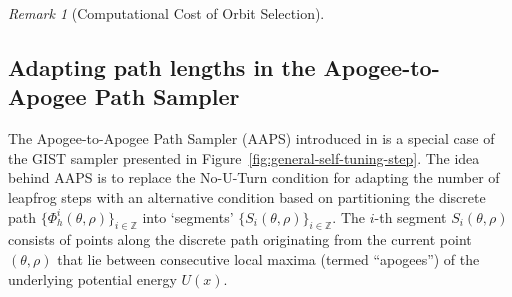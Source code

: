 \documentclass[letterpaper,11pt]{article}
\theoremstyle{plain}%
\theoremstyle{remark}
\newtheorem{remark}{Remark}
\begin{document}
\begin{remark}[Computational Cost of Orbit Selection]

\end{remark}

\subsection{Adapting path lengths in the Apogee-to-Apogee Path Sampler}\label{sec:Apogee-to-Apogee}

The Apogee-to-Apogee Path Sampler (AAPS) introduced in \cite{SherlockUrbasLudkin2023Apogee} is a special case of the GIST sampler presented in Figure~\ref{fig:general-self-tuning-step}.  The idea behind AAPS is to replace the No-U-Turn condition for adapting the number of leapfrog steps with an alternative condition based on partitioning the discrete path $\{ \Phi_h^i (\theta, \rho) \}_{i \in \mathbb{Z}}$ into `segments' $\{S_i(\theta, \rho) \}_{i \in \mathbb{Z}}$. The $i$-th segment $S_i(\theta, \rho)$ consists of points along the discrete path originating from the current point $(\theta, \rho)$ that lie between consecutive local maxima (termed ``apogees'') of the underlying  potential energy $U(x)$. 
\end{document}

